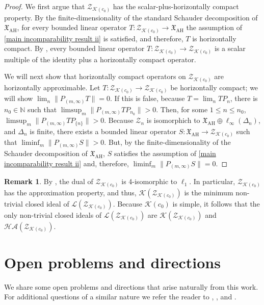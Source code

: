 \documentclass[11pt]{amsart}
\theoremstyle{definition}
\newtheorem{remark}[theorem]{Remark}
\newcommand{\N}{\mathbb{N}}
\numberwithin{equation}{section}
\begin{document}
\begin{proof}
We first argue that $\mathcal{Z}_{\mathcal{K}(c_0)}$ has the scalar-plus-horizontally compact property. By the finite-dimensionality of the standard Schauder decomposition of $\mathfrak{X}_\mathrm{AH}$, for every bounded linear operator $T:\mathcal{Z}_{\mathcal{K}(c_0)}\to \mathfrak{X}_\mathrm{AH}$ the assumption of  \ref{main incomparability result ii} is satisfied, and therefore, $T$ is horizontally compact. By , every bounded linear operator $T:\mathcal{Z}_{\mathcal{K}(c_0)}\to \mathcal{Z}_{\mathcal{K}(c_0)}$ is a scalar multiple of the identity plus a horizontally compact operator.

We will next show that horizontally compact operators on $\mathcal{Z}_{\mathcal{K}(c_0)}$ are horizontally approximable. Let $T:\mathcal{Z}_{\mathcal{K}(c_0)}\to\mathcal{Z}_{\mathcal{K}(c_0)}$ be horizontally compact; we will show $\lim_n\|P_{(m,\infty)}T\| = 0$. If this is false, because $T = \lim_nTP_n$, there is $n_0\in\N$ such that $\limsup_m\|P_{(m,\infty)}TP_{n_0}\| > 0$. Then, for some $1\leq n\leq n_0$, $\limsup_m\|P_{(m,\infty)}TP_{\{n\}}\|>0$. Because $\mathcal{Z}_n$ is isomorphich to $\mathfrak{X}_\mathrm{AH}\oplus\ell_\infty(\Delta_n)$, and $\Delta_n$ is finite, there exists a bounded linear operator $S:\mathfrak{X}_\mathrm{AH}\to\mathcal{Z}_{\mathcal{K}(c_0)}$ such that $\liminf_m\|P_{(m,\infty)}S\| > 0$. But, by the finite-dimensionality of the Schauder decomposition of $\mathfrak{X}_\mathrm{AH}$, $S$ satisfies the assumption of  \ref{main incomparability result ii} and, therefore, $\liminf_m\|P_{(m,\infty)}S\| = 0$.
\end{proof}

\begin{remark}
By , the dual of $\mathcal{Z}_{\mathcal{K}(c_0)}$ is 4-isomorphic to $\ell_1$. In particular, $\mathcal{Z}_{\mathcal{K}(c_0)}$ has the approximation property, and thus, $\mathcal{K}(\mathcal{Z}_{\mathcal{K}(c_0)})$ is the minimum non-trivial closed ideal of $\mathcal{L}(\mathcal{Z}_{\mathcal{K}(c_0)})$. Because $\mathcal{K}(c_0)$ is simple, it follows that the only non-trivial closed ideals of $\mathcal{L}(\mathcal{Z}_{\mathcal{K}(c_0)})$ are $\mathcal{K}(\mathcal{Z}_{\mathcal{K}(c_0)})$ and $\mathcal{HA}(\mathcal{Z}_{\mathcal{K}(c_0)})$.
\end{remark}


\section{Open problems and directions}
We share some open problems and directions that arise naturally from this work. For additional questions of a similar nature we refer the reader to \cite[Section 8]{motakis:puglisi:tolias:2020}, \cite[Section 9]{motakis:2024}, and \cite[Section 3]{motakis:pelczar:2024}.
\end{document}
